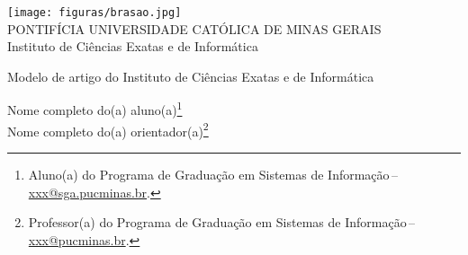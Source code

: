 \documentclass[a4paper,12pt]{article}
\makeatletter
\newcommand{\monog}{Modelo de artigo do Instituto de Ciências Exatas e de Informática}
\newcommand{\AutorA}{Nome completo do(a) aluno(a)}
\newcommand{\funcaoA}{}
\newcommand{\emailA}{\href{mailto:xxx@sga.pucminas.br}{xxx@sga.pucminas.br}}
\newcommand{\cursA}{Aluno(a) do Programa de Graduação em Sistemas de Informação}
\newcommand{\AutorB}{Nome completo do(a) orientador(a)}
\newcommand{\funcaoB}{}
\newcommand{\emailB}{\href{mailto:xxx@sga.pucminas.br}{xxx@pucminas.br}}
\newcommand{\cursB}{Professor(a) do Programa de Graduação em Sistemas de Informação}
\newcommand{\keyword}[1]{\textsf{#1}}
\makeatother
\begin{document}

\begin{center}
\texttt{[image: figuras/brasao.jpg]} \\
PONTIFÍCIA UNIVERSIDADE CATÓLICA DE MINAS GERAIS \\
Instituto de Ciências Exatas e de Informática


\end{center}

 \vspace{0cm} {
 \singlespacing \Large{\monog {} \\ }
 }

\vspace{1.0cm}

\begin{flushright}
\singlespacing 
\normalsize{\AutorA \footnote{\funcaoA \cursA \,-- \emailA . }} \\
\normalsize{\AutorB \footnote{\funcaoB \cursB \,-- \emailB . }} \\
\end{flushright}
\thispagestyle{empty}

\vspace{1.0cm}

\begin{abstract}
\noindent
O resumo é redigido em parágrafo único. Um bom resumo deve conter uma frase para cada um dos tópicos: contexto, problema, justificativa, objetivo, desenvolvimento, resultados e conclusão do documento. Convém usar o verbo de forma impessoal. Seguindo o formato de artigo de periódico, o resumo deverá conter de 100 a 250 palavras. Evite o uso de símbolos e contrações que não sejam de uso corrente, bem como o uso de fórmulas, equações e referências que não sejam absolutamente necessários. Quando seu emprego for imprescindível, defini-los na primeira vez que aparecerem. Abaixo do resumo apresente a expressão ``Palavras-chave'' e, após os dois pontos, os termos com as iniciais em letra minúscula e separadas com ponto e vírgula (exceto para nomes próprios e científicos) e finalizadas por ponto final. 
\\\textbf{\keyword{Palavras-chave:}} template; \LaTeX; Abakos; periódicos.
\end{abstract}
\end{document}
